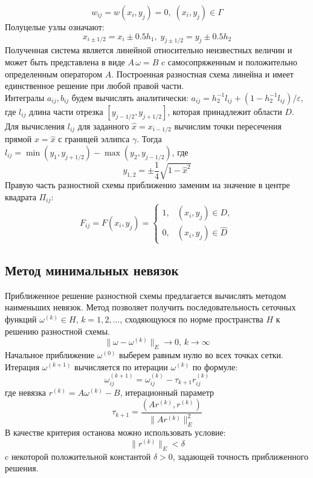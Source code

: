 \documentclass[oneside,final,14pt]{extreport}
\begin{document}
\[ w_{ij} = w(x_i, y_j ) = 0, \; (x_i, y_j ) \in \Gamma \]
Полуцелые узлы означают:
\[ x_{i \pm 1/2} = x_i \pm 0.5h_1, \; y_{j \pm 1/2} = y_j \pm 0.5h_2 \]
Полученная система является линейной относительно неизвестных величин
и может быть представлена в виде \( A \, \omega = B \)
c самосопряженным и положительно определенным оператором \( A \).
Построенная разностная схема линейна и имеет
единственное решение при любой правой части.\\
\noindent
Интегралы \( a_{ij}, b_{ij} \) будем вычислять аналитически:
\( a_{ij} = h_2^{-1} l_{ij} + (1 - h_2^{-1} l_{ij}) / \varepsilon \),
где \( l_{ij} \) длина части отрезка \( [y_{j-1/2}, y_{j+1/2}] \), которая
принадлежит области \( D \).
Для вычисления \( l_{ij} \) для заданного \( \hat x = x_{i-1/2} \)
вычислим точки пересечения прямой \( x = \hat x \) с границей 
эллипса \( \gamma \). Тогда \( l_{ij} = \min(y_1, y_{j+1/2}) - \max(y_2, y_{j-1/2}) \), где
\[ y_{1,2} = \pm \frac{1}{4}\sqrt{1 - \hat x^2} \]
Правую часть разностной схемы приближенно заменим на значение
в центре квадрата \( \Pi_{ij} \): 
\[ F_{ij} = F(x_i,y_j) =  \begin{cases}
    1,   & (x_i, y_j) \in D, \\
    0,   & (x_i, y_j) \in \hat D
\end{cases} \]
\subsection{Метод минимальных невязок}
\noindent
Приближенное решение разностной схемы предлагается вычислять методом
наименьших невязок.
Метод позволяет получить последовательность сеточных функций
\( \omega^{(k)} \in H, \, k = 1,2,\ldots \), сходяющуюся по норме пространства
\( H \) к решению разностной схемы.
\[ \| \omega - \omega^{(k)} \|_E \rightarrow 0, \, k \rightarrow \infty \]
Начальное приближение \( \omega^{(0)} \) выберем равным нулю во всех
точках сетки. Итерация \( \omega^{(k+1)} \) вычисляется по итерации
\( \omega^{(k)} \) по формуле:
\[ \omega_{ij}^{(k+1)} = \omega_{ij}^{(k)} - \tau_{k+1} r_{ij}^{(k)} \]
где невязка \( r^{(k)} = A \omega^{(k)} - B \), итерационный параметр
\[ \tau_{k+1} = \frac{(A r^{(k)}, r^{(k)})}{\|A r^{(k)}\|^2_E} \]
В качестве критерия останова можно использовать условие:
\[ \| r^{(k)} \|_E < \delta \]
c некоторой положительной константой \( \delta > 0 \), задающей точность
приближенного решения.
\newpage
\end{document}
